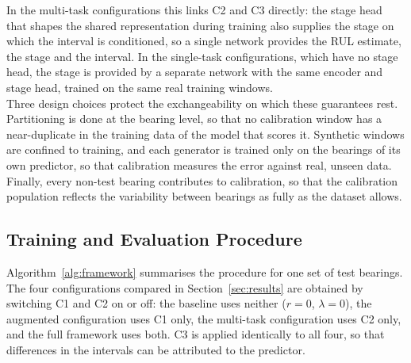 In the multi-task configurations this links C2 and C3 directly: the
stage head that shapes the shared representation during training also
supplies the stage on which the interval is conditioned, so a single
network provides the RUL estimate, the stage and the interval. In the
single-task configurations, which have no stage head, the stage is
provided by a separate network with the same encoder and stage head,
trained on the same real training windows.\\

Three design choices protect the exchangeability on which these
guarantees rest. Partitioning is done at the bearing level, so that no
calibration window has a near-duplicate in the training data of the
model that scores it. Synthetic windows are confined to training, and
each generator is trained only on the bearings of its own predictor,
so that calibration measures the error against real, unseen data.
Finally, every non-test bearing contributes to calibration, so that
the calibration population reflects the variability between bearings
as fully as the dataset allows.

\subsection{Training and Evaluation Procedure}
\label{sec:method_procedure}

Algorithm~\ref{alg:framework} summarises the procedure for one set of
test bearings. The four configurations compared in
Section~\ref{sec:results} are obtained by switching C1 and C2 on or
off: the baseline uses neither ($r = 0$, $\lambda = 0$), the augmented
configuration uses C1 only, the multi-task configuration uses C2 only,
and the full framework uses both. C3 is applied identically to all
four, so that differences in the intervals can be attributed to the
predictor.

